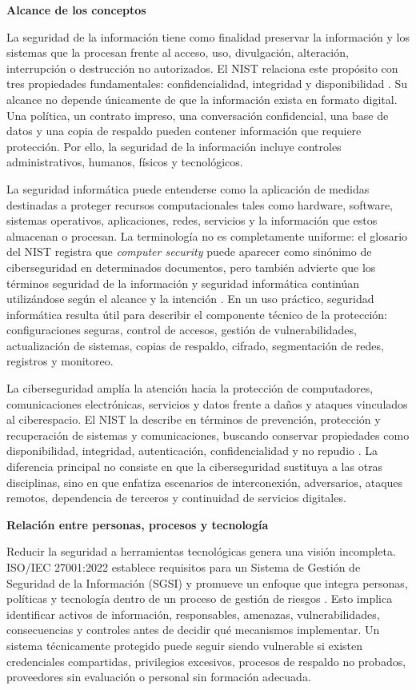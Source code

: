 \documentclass[12pt,letterpaper]{article}
\begin{document}
\textbf{Alcance de los conceptos}

La seguridad de la información tiene como finalidad preservar la información y los sistemas que la procesan frente al acceso, uso, divulgación, alteración, interrupción o destrucción no autorizados. El NIST relaciona este propósito con tres propiedades fundamentales: confidencialidad, integridad y disponibilidad \parencite{nist2026infosec}. Su alcance no depende únicamente de que la información exista en formato digital. Una política, un contrato impreso, una conversación confidencial, una base de datos y una copia de respaldo pueden contener información que requiere protección. Por ello, la seguridad de la información incluye controles administrativos, humanos, físicos y tecnológicos.

La seguridad informática puede entenderse como la aplicación de medidas destinadas a proteger recursos computacionales tales como hardware, software, sistemas operativos, aplicaciones, redes, servicios y la información que estos almacenan o procesan. La terminología no es completamente uniforme: el glosario del NIST registra que \textit{computer security} puede aparecer como sinónimo de ciberseguridad en determinados documentos, pero también advierte que los términos seguridad de la información y seguridad informática continúan utilizándose según el alcance y la intención \parencite{nist2026computer}. En un uso práctico, seguridad informática resulta útil para describir el componente técnico de la protección: configuraciones seguras, control de accesos, gestión de vulnerabilidades, actualización de sistemas, copias de respaldo, cifrado, segmentación de redes, registros y monitoreo.

La ciberseguridad amplía la atención hacia la protección de computadores, comunicaciones electrónicas, servicios y datos frente a daños y ataques vinculados al ciberespacio. El NIST la describe en términos de prevención, protección y recuperación de sistemas y comunicaciones, buscando conservar propiedades como disponibilidad, integridad, autenticación, confidencialidad y no repudio \parencite{nist2026cyber}. La diferencia principal no consiste en que la ciberseguridad sustituya a las otras disciplinas, sino en que enfatiza escenarios de interconexión, adversarios, ataques remotos, dependencia de terceros y continuidad de servicios digitales.

\textbf{Relación entre personas, procesos y tecnología}

Reducir la seguridad a herramientas tecnológicas genera una visión incompleta. ISO/IEC 27001:2022 establece requisitos para un Sistema de Gestión de Seguridad de la Información (SGSI) y promueve un enfoque que integra personas, políticas y tecnología dentro de un proceso de gestión de riesgos \parencite{iso27001}. Esto implica identificar activos de información, responsables, amenazas, vulnerabilidades, consecuencias y controles antes de decidir qué mecanismos implementar. Un sistema técnicamente protegido puede seguir siendo vulnerable si existen credenciales compartidas, privilegios excesivos, procesos de respaldo no probados, proveedores sin evaluación o personal sin formación adecuada.
\end{document}

